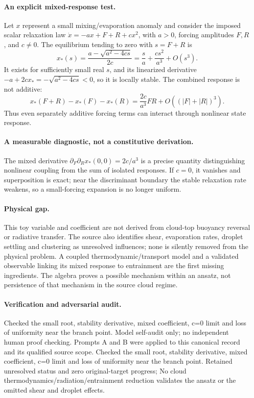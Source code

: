 \documentclass[11pt]{article}
\begin{document}
\paragraph{An explicit mixed-response test.} Let $x$ represent a small mixing/evaporation anomaly and consider the imposed scalar relaxation law $\dot x=-ax+F+R+cx^2$, with $a>0$, forcing amplitudes $F,R$, and $c\ne0$. The equilibrium tending to zero with $s=F+R$ is
\[
 x_*(s)=\frac{a-\sqrt{a^2-4cs}}{2c}
 =\frac{s}{a}+\frac{cs^2}{a^3}+O(s^3).
\]
It exists for sufficiently small real $s$, and its linearized derivative $-a+2cx_*=-\sqrt{a^2-4cs}<0$, so it is locally stable. The combined response is not additive:
\[
 x_*(F+R)-x_*(F)-x_*(R)=\frac{2c}{a^3}FR+O((|F|+|R|)^3).
\]
Thus even separately additive forcing terms can interact through nonlinear state response.

\paragraph{A measurable diagnostic, not a constitutive derivation.} The mixed derivative $\partial_F\partial_Rx_*(0,0)=2c/a^3$ is a precise quantity distinguishing nonlinear coupling from the sum of isolated responses. If $c=0$, it vanishes and superposition is exact; near the discriminant boundary the stable relaxation rate weakens, so a small-forcing expansion is no longer uniform.

\paragraph{Physical gap.} This toy variable and coefficient are not derived from cloud-top buoyancy reversal or radiative transfer. The source also identifies shear, evaporation rates, droplet settling and clustering as unresolved influences; none is silently removed from the physical problem. A coupled thermodynamic/transport model and a validated observable linking its mixed response to entrainment are the first missing ingredients. The algebra proves a possible mechanism within an ansatz, not persistence of that mechanism in the source cloud regime.

\paragraph{Verification and adversarial audit.}
Checked the small root, stability derivative, mixed coefficient, c=0 limit and loss of uniformity near the branch point. Model self-audit only; no independent human proof checking. Prompts A and B were applied to this canonical record and its qualified source scope. Checked the small root, stability derivative, mixed coefficient, c=0 limit and loss of uniformity near the branch point. Retained unresolved status and zero original-target progress; No cloud thermodynamics/radiation/entrainment reduction validates the ansatz or the omitted shear and droplet effects.
\end{document}
